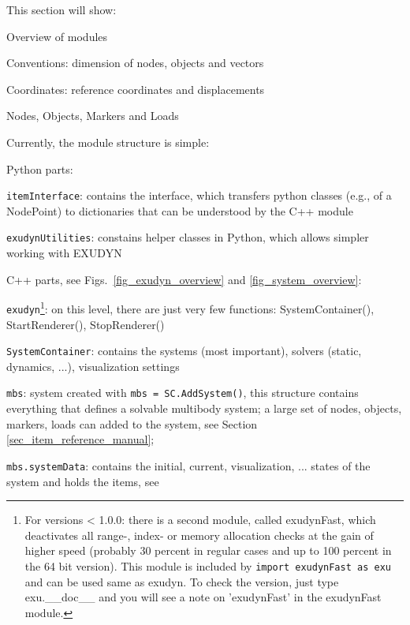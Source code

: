 
 \label{sec_programStructure}
This section will show:
\bi
  \item Overview of modules
  \item Conventions: dimension of nodes, objects and vectors
	\item Coordinates: reference coordinates and displacements
	\item Nodes, Objects, Markers and Loads
\ei

Currently, the module structure is simple:
\bi
  \item Python parts:
	\bi
	  \item \texttt{itemInterface}: contains the interface, which transfers python classes (e.g., of a NodePoint) to dictionaries that can be understood by the C++ module
	  \item \texttt{exudynUtilities}: constains helper classes in Python, which allows simpler working with EXUDYN
	\ei
  \item C++ parts, see Figs.\ \ref{fig_exudyn_overview} and \ref{fig_system_overview}:
	\bi
	  \item \texttt{exudyn}\footnote{For versions < 1.0.0: there is a second module, called exudynFast, which deactivates all range-, index- or memory allocation checks at the gain of higher speed (probably 30 percent in regular cases and up to 100 percent in the 64 bit version). This module is included by \texttt{import exudynFast as exu} and can be used same as exudyn. To check the version, just type exu.\_\_doc\_\_ and you will see a note on 'exudynFast' in the exudynFast module.}: on this level, there are just very few functions: SystemContainer(), StartRenderer(), StopRenderer()
	  \item \texttt{SystemContainer}: contains the systems (most important), solvers (static, dynamics, ...), visualization settings
	  \item \texttt{mbs}: system created with \texttt{mbs = SC.AddSystem()}, this structure contains everything that defines a solvable multibody system; a large set of nodes, objects, markers, 
		loads can added to the system, see Section \ref{sec_item_reference_manual};
		\item \texttt{mbs.systemData}: contains the initial, current, visualization, ... states of the system and holds the items, see 
	\ei
\ei
%
